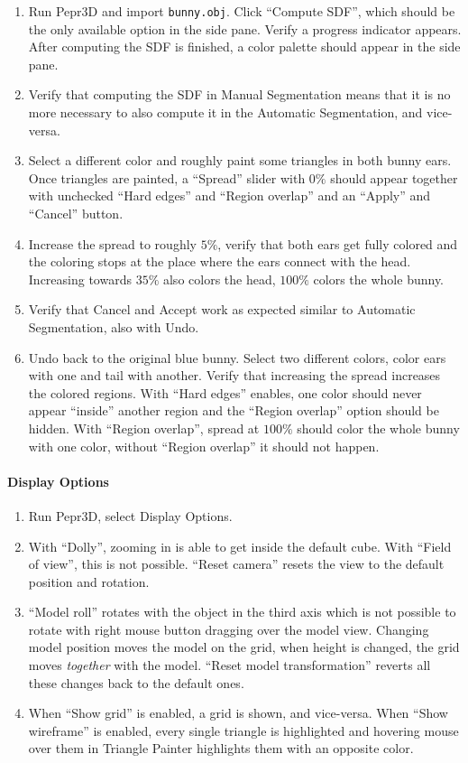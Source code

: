 \begin{enumerate}
\item Run Pepr3D and import \texttt{bunny.obj}. Click ``Compute SDF'', which should be the only available option in the side pane. Verify a progress indicator appears. After computing the SDF is finished, a color palette should appear in the side pane.
\item Verify that computing the SDF in Manual Segmentation means that it is no more necessary to also compute it in the Automatic Segmentation, and vice-versa.
\item Select a different color and roughly paint some triangles in both bunny ears. Once triangles are painted, a ``Spread'' slider with $0\%$ should appear together with unchecked ``Hard edges'' and ``Region overlap'' and an ``Apply'' and ``Cancel'' button.
\item Increase the spread to roughly $5\%$, verify that both ears get fully colored and the coloring stops at the place where the ears connect with the head. Increasing towards $35\%$ also colors the head, $100\%$ colors the whole bunny.
\item Verify that Cancel and Accept work as expected similar to Automatic Segmentation, also with Undo.
\item Undo back to the original blue bunny. Select two different colors, color ears with one and tail with another. Verify that increasing the spread increases the colored regions. With ``Hard edges'' enables, one color should never appear ``inside'' another region and the ``Region overlap'' option should be hidden. With ``Region overlap'', spread at $100\%$ should color the whole bunny with one color, without ``Region overlap'' it should not happen.
\end{enumerate}

\paragraph{Display Options}

\begin{enumerate}
\item Run Pepr3D, select Display Options.
\item With ``Dolly'', zooming in is able to get inside the default cube. With ``Field of view'', this is not possible. ``Reset camera'' resets the view to the default position and rotation.
\item ``Model roll'' rotates with the object in the third axis which is not possible to rotate with right mouse button dragging over the model view. Changing model position moves the model on the grid, when height is changed, the grid moves \emph{together} with the model. ``Reset model transformation'' reverts all these changes back to the default ones.
\item When ``Show grid'' is enabled, a grid is shown, and vice-versa. When ``Show wireframe'' is enabled, every single triangle is highlighted and hovering mouse over them in Triangle Painter highlights them with an opposite color.
\end{enumerate}

